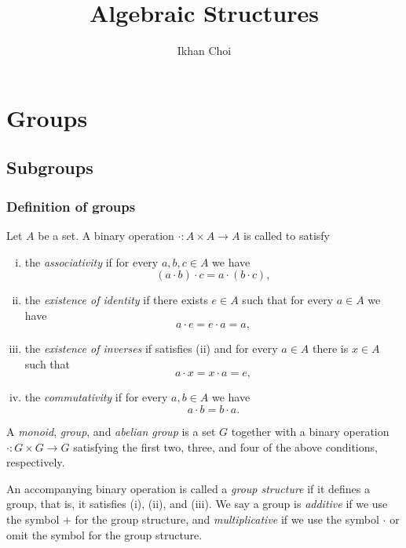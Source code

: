 \documentclass{../../large}
\begin{document}
\title{Algebraic Structures}
\author{Ikhan Choi}
\maketitle
\tableofcontents

\part{Groups}
\chapter{Subgroups}
\section{Definition of groups}

\begin{prb}
Let $A$ be a set.
A binary operation $\cdot:A\times A\to A$ is called to satisfy
\begin{enumerate}[(i)]
\item the \emph{associativity} if for every $a,b,c\in A$ we have
\[(a\cdot b)\cdot c=a\cdot(b\cdot c),\]
\item the \emph{existence of identity} if there exists $e\in A$ such that for every $a\in A$ we have
\[a\cdot e=e\cdot a=a,\]
\item the \emph{existence of inverses} if satisfies (ii) and for every $a\in A$ there is $x\in A$ such that
\[a\cdot x=x\cdot a=e,\]
\item the \emph{commutativity} if for every $a,b\in A$ we have
\[a\cdot b= b\cdot a.\]
\end{enumerate}
A \emph{monoid}, \emph{group}, and \emph{abelian group} is a set $G$ together with a binary operation $\cdot:G\times G\to G$ satisfying the first two, three, and four of the above conditions, respectively.

An accompanying binary operation is called a \emph{group structure} if it defines a group, that is, it satisfies (i), (ii), and (iii).
We say a group is \emph{additive} if we use the symbol $+$ for the group structure, and \emph{multiplicative} if we use the symbol $\cdot$ or omit the symbol for the group structure.
\end{prb}
\end{document}
